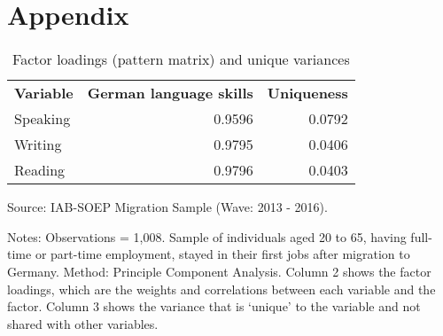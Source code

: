 \documentclass[12pt,a4paper]{article}
\begin{document}
\section{Appendix}

\begin{table}[htbp]
  \centering
  \caption{Factor loadings (pattern matrix) and unique variances}
\begin{center}
    \begin{tabular}{lrr}
    \toprule
    \multicolumn{1}{c}{\textbf{Variable}} & \multicolumn{1}{c}{\textbf{German language skills}} & \multicolumn{1}{c}{\textbf{Uniqueness}} \\
    Speaking & 0.9596 & 0.0792 \\
    Writing & 0.9795 & 0.0406 \\
    Reading & 0.9796 & 0.0403 \\
    \bottomrule
    \end{tabular}%
\end{center}
\begin{tablenotes}
      \small
      \item Source: IAB-SOEP Migration Sample (Wave: 2013 - 2016).
      \item Notes: Observations = 1,008. Sample of individuals aged 20 to 65, having full-time or part-time employment, stayed in their first jobs after migration to Germany.  Method: Principle Component Analysis. Column 2 shows the factor loadings, which are the weights and correlations between each variable and the factor. Column 3 shows  the variance that is ‘unique’ to the variable and not shared with other variables.
    \end{tablenotes}
\end{table}%
\end{document}
